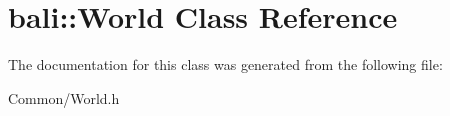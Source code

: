 \hypertarget{classbali_1_1_world}{\section{bali\-:\-:World Class Reference}
\label{classbali_1_1_world}
}


The documentation for this class was generated from the following file\-:\begin{DoxyCompactItemize}
\item 
Common/World.\-h\end{DoxyCompactItemize}
